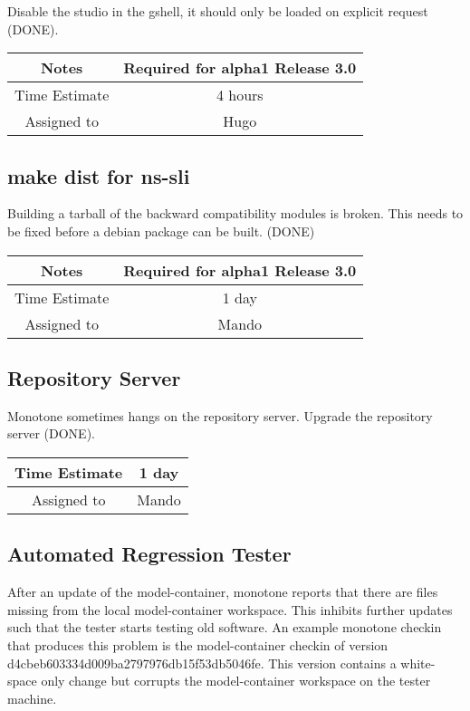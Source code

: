 \documentclass[12pt]{article}
\begin{document}
Disable the studio in the gshell, it should only be loaded on explicit
request (DONE).

{
  \vspace{5mm}
  \centering
  \begin{tabular}{|c|c|}
    \hline
    Notes
    & Required for alpha1 Release 3.0 \\
    \hline
    Time Estimate
    & 4 hours \\
    \hline
    Assigned to
    & Hugo \\
    \hline
  \end{tabular}
}


\subsection{make dist for ns-sli}

Building a tarball of the backward compatibility modules is broken.
This needs to be fixed before a debian package can be built. (DONE)

{
  \vspace{5mm}
  \centering
  \begin{tabular}{|c|c|}
    \hline
    Notes
    & Required for alpha1 Release 3.0 \\
    \hline
    Time Estimate
    & 1 day \\
    \hline
    Assigned to
    & Mando \\
    \hline
  \end{tabular}
}


\subsection{Repository Server}
\label{sec:repository-server}
Monotone sometimes hangs on the repository server.  Upgrade the
repository server (DONE).

{
  \vspace{5mm}
  \centering
  \begin{tabular}{|c|c|}
    \hline
    Time Estimate
    & 1 day \\
    \hline
    Assigned to
    & Mando \\
    \hline
  \end{tabular}
}


\subsection{Automated Regression Tester}

After an update of the model-container, monotone reports that there
are files missing from the local model-container workspace.  This
inhibits further updates such that the tester starts testing old
software.  An example monotone checkin that produces this problem is
the model-container checkin of version
d4cbeb603334d009ba2797976db15f53db5046fe.  This version contains a
white-space only change but corrupts the model-container workspace on
the tester machine.
\end{document}
